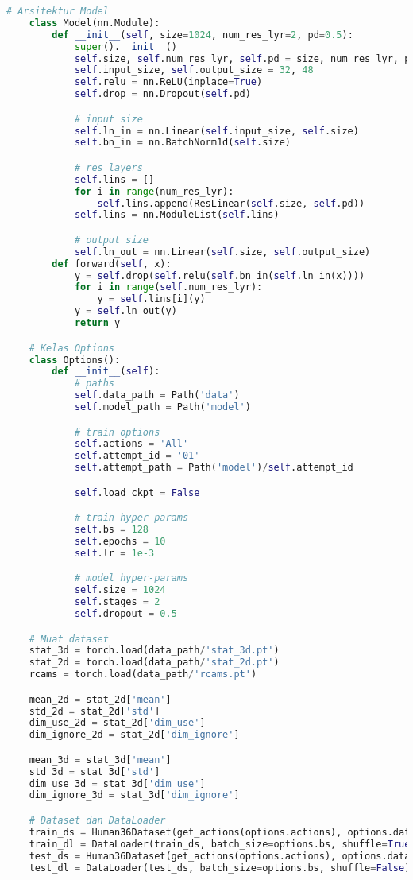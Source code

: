 \begin{lstlisting}[language=Python,multicols=2,basicstyle=\tiny,breaklines=true]
    # Arsitektur Model
    class Model(nn.Module):
        def __init__(self, size=1024, num_res_lyr=2, pd=0.5):
            super().__init__()
            self.size, self.num_res_lyr, self.pd = size, num_res_lyr, pd
            self.input_size, self.output_size = 32, 48
            self.relu = nn.ReLU(inplace=True)
            self.drop = nn.Dropout(self.pd)

            # input size
            self.ln_in = nn.Linear(self.input_size, self.size)
            self.bn_in = nn.BatchNorm1d(self.size)

            # res layers
            self.lins = []
            for i in range(num_res_lyr):
                self.lins.append(ResLinear(self.size, self.pd))
            self.lins = nn.ModuleList(self.lins)

            # output size
            self.ln_out = nn.Linear(self.size, self.output_size)
        def forward(self, x):
            y = self.drop(self.relu(self.bn_in(self.ln_in(x))))
            for i in range(self.num_res_lyr):
                y = self.lins[i](y)
            y = self.ln_out(y)
            return y

    # Kelas Options
    class Options():
        def __init__(self):
            # paths
            self.data_path = Path('data')
            self.model_path = Path('model')

            # train options
            self.actions = 'All'
            self.attempt_id = '01'
            self.attempt_path = Path('model')/self.attempt_id

            self.load_ckpt = False

            # train hyper-params
            self.bs = 128
            self.epochs = 10
            self.lr = 1e-3

            # model hyper-params
            self.size = 1024
            self.stages = 2
            self.dropout = 0.5

    # Muat dataset
    stat_3d = torch.load(data_path/'stat_3d.pt')
    stat_2d = torch.load(data_path/'stat_2d.pt')
    rcams = torch.load(data_path/'rcams.pt')

    mean_2d = stat_2d['mean']
    std_2d = stat_2d['std']
    dim_use_2d = stat_2d['dim_use']
    dim_ignore_2d = stat_2d['dim_ignore']

    mean_3d = stat_3d['mean']
    std_3d = stat_3d['std']
    dim_use_3d = stat_3d['dim_use']
    dim_ignore_3d = stat_3d['dim_ignore']

    # Dataset dan DataLoader
    train_ds = Human36Dataset(get_actions(options.actions), options.data_path, is_train=True)
    train_dl = DataLoader(train_ds, batch_size=options.bs, shuffle=True)
    test_ds = Human36Dataset(get_actions(options.actions), options.data_path, is_train=False)
    test_dl = DataLoader(test_ds, batch_size=options.bs, shuffle=False)


\end{lstlisting}
